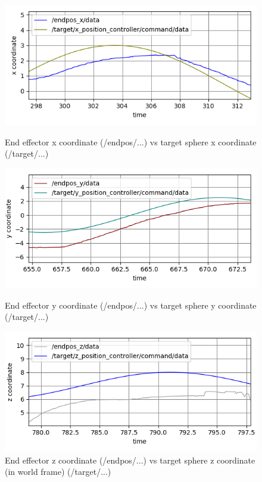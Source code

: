 \documentclass[11pt]{report}
\begin{document}
\begin{figure}[H]

  \centering
  \begin{minipage}[b]{0.44\textwidth}
    \includegraphics[width=\textwidth]{3.2.x.png}
    \caption{End effector x coordinate (/endpos/...) vs target sphere x coordinate (/target/...)}
  \end{minipage}
  \hfill
  \begin{minipage}[b]{0.44\textwidth}
    \includegraphics[width=\textwidth]{3.2.y.png}
    \caption{End effector y coordinate (/endpos/...) vs target sphere y coordinate (/target/...)}
  \end{minipage}
\begin{minipage}[b]{0.44\textwidth}
    \includegraphics[width=\textwidth]{3.2.z.png}
    \caption{End effector z coordinate (/endpos/...) vs target sphere z coordinate (in world frame) (/target/...)}
  \end{minipage}
\end{figure}
\end{document}
